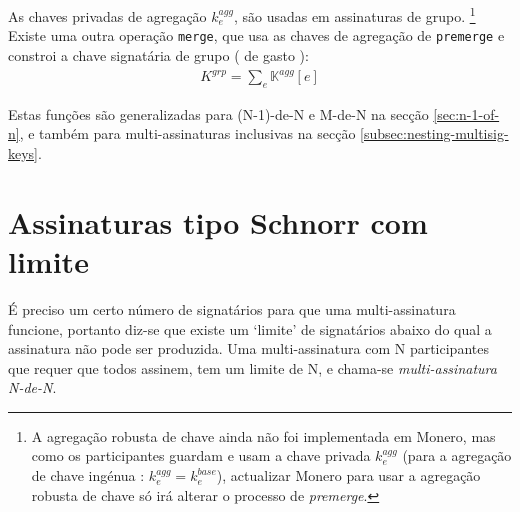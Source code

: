As chaves privadas de agregação $k^{agg}_e$, são usadas em assinaturas de grupo.
\footnote{A agregação robusta de chave ainda não foi implementada em Monero, mas como os participantes guardam e usam a chave privada $k^{agg}_e$ (para a agregação de chave ingénua : $k^{agg}_e = k^{base}_e$), actualizar Monero para usar a agregação robusta de chave só irá alterar o processo de {\em premerge}.}
Existe uma outra operação {\tt merge}, que usa as chaves de agregação de {\tt premerge} e constroi a chave signatária de grupo ( de gasto ):
\vspace{.175cm}
\begin{align*}
K^{grp} = \sum_e \mathbb{K}^{agg}[e]
\end{align*}


Estas funções são generalizadas para (N-1)-de-N e M-de-N na secção \ref{sec:n-1-of-n}, e também para multi-assinaturas inclusivas na secção \ref{subsec:nesting-multisig-keys}.

\section{Assinaturas tipo Schnorr com limite}
\label{sec:threshold-schnorr}

É preciso um certo número de signatários para que uma multi-assinatura funcione, portanto diz-se que existe um `limite' de signatários abaixo do qual a assinatura não pode ser produzida. Uma multi-assinatura com N participantes que requer que todos assinem, tem um limite de N, e chama-se {\em multi-assinatura N-de-N}.     

